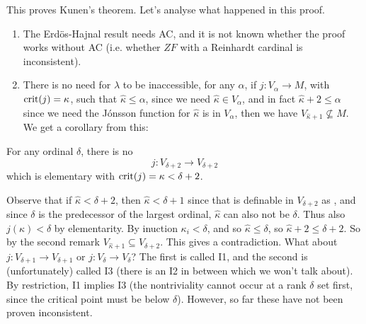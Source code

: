 \documentclass{article}
\begin{document}
\endproof 
\endproof
This proves Kunen's theorem.
Let's analyse what happened in this proof. 
\begin{remark*}\hspace{0.1cm}
\begin{enumerate}
    \item The Erd\"os-Hajnal result needs AC, and it is not known whether the proof works without AC (i.e. whether $ZF$ with a Reinhardt cardinal is inconsistent).
    \item There is no need for $\lambda$ to be inaccessible, for any $\alpha$, if $j: V_{\alpha} \to M$, with $\operatorname{crit}(j)=\kappa$, such that $\hat{\kappa}\leq \alpha$, since we need $\hat{\kappa} \in V_{\alpha}$, and in fact $\hat{\kappa}+2 \leq \alpha$ since we need the J\'onsson function for $\hat{\kappa}$ is in $V_{\alpha}$, then we have $V_{\hat{\kappa}+1} \nsubseteq M$. We get a corollary from this:
\end{enumerate}
\end{remark*}
\begin{corollary}
    For any ordinal $\delta$, there is no \[ j : V_{\delta+2} \to V_{\delta+2}\]
    which is elementary with $\operatorname{crit}(j)=\kappa < \delta+2$.
\end{corollary}
\proof Observe that if $\hat{\kappa}< \delta+2$, then $\hat{\kappa} < \delta+1$ since that is definable in $V_{\delta+2}$ as , and since $\delta$ is the predecessor of the largest ordinal, $\hat{\kappa}$ can also not be $\delta$. Thus also $j(\kappa)<\delta$ by elementarity. By inuction $\kappa_{i} < \delta$, and so $\hat{\kappa} \leq \delta$, so $\hat{\kappa}+2 \leq \delta+2$. So by the second remark $V_{\hat{\kappa}+1} \subseteq V_{\delta+2}$. This gives a contradiction. \endproof
What about $j : V_{\delta+1} \to V_{\delta+1}$ or $j: V_{\delta} \to V_{\delta}$? The first is called I1, and the second is (unfortunately) called I3 (there is an I2 in between which we won't talk about). By restriction, I1 implies I3 (the nontriviality cannot occur at a rank $\delta$ set first, since the critical point must be below $\delta$). However, so far these have not been proven inconsistent.
\end{document}
